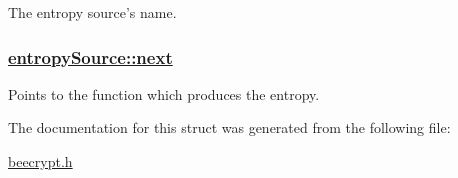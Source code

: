 The entropy source's name. 

\hypertarget{structentropySource_o1}{
\subsubsection[next]{\setlength{\rightskip}{0pt plus 5cm}\hyperlink{structentropySource_o1}{entropy\-Source::next}}}
\label{structentropySource_o1}


Points to the function which produces the entropy. 



The documentation for this struct was generated from the following file:\begin{CompactItemize}
\item 
\hyperlink{beecrypt_8h}{beecrypt.h}\end{CompactItemize}
